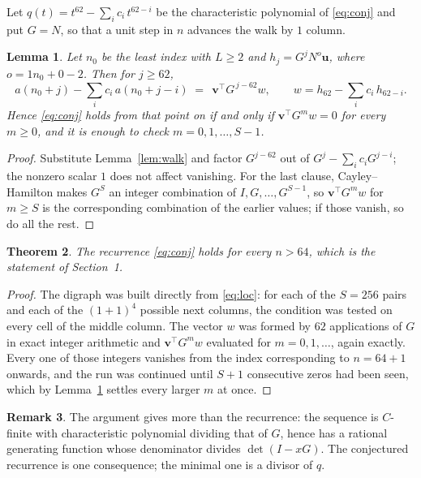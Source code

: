 \documentclass[11pt,a4paper]{article}
\theoremstyle{plain}
\newtheorem{theorem}{Theorem}
\newtheorem{lemma}[theorem]{Lemma}
\theoremstyle{definition}
\newtheorem{remark}[theorem]{Remark}
\begin{document}
Let $q(t)=t^{62}-\sum_i c_i\,t^{62-i}$ be the characteristic polynomial of
\eqref{eq:conj} and put $G=N$, so that a unit step in $n$ advances the walk by
$1$ column.

\begin{lemma}\label{lem:crit}
Let $n_0$ be the least index with $L\ge2$ and $h_j=G^{j}N^{o}\mathbf{u}$, where
$o=1n_0+0-2$. Then for $j\ge62$,
\[
a(n_0+j)-\sum_i c_i\,a(n_0+j-i)\;=\;\,\mathbf{v}^{\!\top}G^{\,j-62}w,
\qquad w=h_{62}-\sum_i c_i\,h_{62-i} .
\]
Hence \eqref{eq:conj} holds from that point on if and only if
$\mathbf{v}^{\!\top}G^{m}w=0$ for every $m\ge0$, and it is enough to check
$m=0,1,\dots,S-1$.
\end{lemma}

\begin{proof}
Substitute Lemma~\ref{lem:walk} and factor $G^{j-62}$ out of
$G^{j}-\sum_ic_iG^{j-i}$; the nonzero scalar $1$ does not affect
vanishing. For the last clause, Cayley--Hamilton makes $G^{S}$ an integer combination of
$I,G,\dots,G^{S-1}$, so $\mathbf{v}^{\!\top}G^{m}w$ for $m\ge S$ is the corresponding
combination of the earlier values; if those vanish, so do all the rest.
\end{proof}

\begin{theorem}
The recurrence \eqref{eq:conj} holds for every $n>64$, which is the statement of
Section~1.
\end{theorem}

\begin{proof}
The digraph was built directly from \eqref{eq:loc}: for each of the $S=256$ pairs and each
of the $(1+1)^{4}$ possible next columns, the condition was tested on every cell of
the middle column. The vector $w$ was formed by $62$ applications of $G$ in exact integer
arithmetic and $\mathbf{v}^{\!\top}G^{m}w$ evaluated for $m=0,1,\dots$, again exactly.
Every one of those integers vanishes from the index corresponding to $n=64+1$ onwards,
and the run was continued until $S+1$ consecutive zeros had been seen, which by
Lemma~\ref{lem:crit} settles every larger $m$ at once.
\end{proof}

\begin{remark}
The argument gives more than the recurrence: the sequence is $C$-finite with characteristic
polynomial dividing that of $G$, hence has a rational generating function whose denominator
divides $\det(I-xG)$. The conjectured recurrence is one consequence; the minimal one is a
divisor of $q$.
\end{remark}
\end{document}
